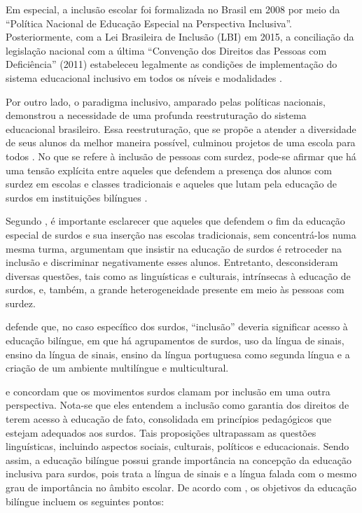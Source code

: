Em especial, a inclusão escolar foi formalizada no Brasil em 2008 por meio da ``Política Nacional de Educação Especial na Perspectiva Inclusiva''. Posteriormente, com a Lei Brasileira de Inclusão (LBI) em 2015, a conciliação da legislação nacional com a última ``Convenção dos Direitos das Pessoas com Deficiência'' (2011) estabeleceu legalmente as condições de implementação do sistema educacional inclusivo em todos os níveis e modalidades \cite{Alana2019}.

Por outro lado, o paradigma inclusivo, amparado pelas políticas nacionais, demonstrou a necessidade de uma profunda reestruturação do sistema educacional brasileiro. Essa reestruturação, que se propõe a atender a diversidade de seus alunos da melhor maneira possível, culminou projetos de uma escola para todos \cite{Almeida2015}. No que se refere à inclusão de pessoas com surdez, pode-se afirmar que há uma tensão explícita entre aqueles que defendem a presença dos alunos com surdez em escolas e classes tradicionais e aqueles que lutam pela educação de surdos em instituições bilíngues \cite{Almeida2015,Quadros2019}.

Segundo , é importante esclarecer que aqueles que defendem o fim da educação especial de surdos e sua inserção nas escolas tradicionais, sem concentrá-los numa mesma turma, argumentam que insistir na educação de surdos é retroceder na inclusão e discriminar negativamente esses alunos. Entretanto, desconsideram diversas questões, tais como as linguísticas e culturais, intrínsecas à educação de surdos, e, também, a grande heterogeneidade presente em meio às pessoas com surdez.%

 defende que, no caso específico dos surdos, ``inclusão'' deveria significar acesso à educação bilíngue, em que há agrupamentos de surdos, uso da língua de sinais, ensino da língua de sinais, ensino da língua portuguesa como segunda língua e a criação de um ambiente multilíngue e multicultural.

 e  concordam que os movimentos surdos clamam por inclusão em uma outra perspectiva. Nota-se que eles entendem a inclusão como garantia dos direitos de terem acesso à educação de fato, consolidada em princípios pedagógicos que estejam adequados aos surdos. Tais proposições ultrapassam as questões linguísticas, incluindo aspectos sociais, culturais, políticos e educacionais. Sendo assim, a educação bilíngue possui grande importância na concepção da educação inclusiva para surdos, pois trata a língua de sinais e a língua falada com o mesmo grau de importância no âmbito escolar. De acordo com , os objetivos da educação bilíngue incluem os seguintes pontos:

